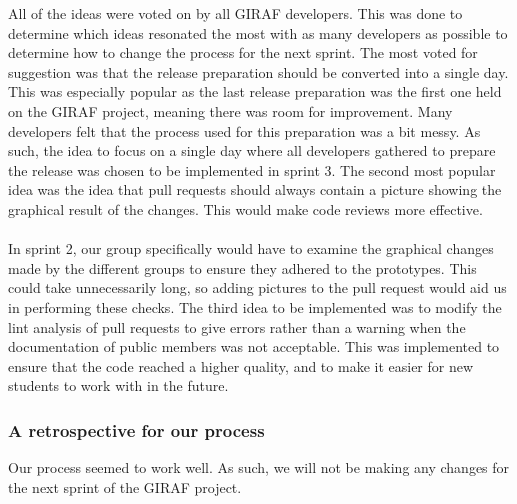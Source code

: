 \noindent
All of the ideas were voted on by all GIRAF developers.
This was done to determine which ideas resonated the most with as many developers as possible to determine how to change the process for the next sprint.
The most voted for suggestion was that the release preparation should be converted into a single day.
This was especially popular as the last release preparation was the first one held on the GIRAF project, meaning there was room for improvement.
Many developers felt that the process used for this preparation was a bit messy.
As such, the idea to focus on a single day where all developers gathered to prepare the release was chosen to be implemented in sprint 3.
The second most popular idea was the idea that pull requests should always contain a picture showing the graphical result of the changes.
This would make code reviews more effective.
\\\\
In sprint 2, our group specifically would have to examine the graphical changes made by the different groups to ensure they adhered to the prototypes.
This could take unnecessarily long, so adding pictures to the pull request would aid us in performing these checks.
The third idea to be implemented was to modify the lint analysis of pull requests to give errors rather than a warning when the documentation of public members was not acceptable.
This was implemented to ensure that the code reached a higher quality, and to make it easier for new students to work with in the future.

\subsubsection{A retrospective for our process}
Our process seemed to work well.
As such, we will not be making any changes for the next sprint of the GIRAF project.
